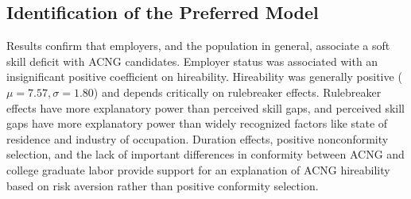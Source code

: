 \documentclass[review]{elsarticle}
\begin{document}



\subsection{Identification of the Preferred Model}

Results confirm that employers, and the population in general, associate a soft skill deficit with ACNG candidates.
Employer status was associated with an insignificant positive coefficient on hireability.
Hireability was generally positive ($\mu = 7.57, \sigma = 1.80$) and depends critically on rulebreaker effects.
Rulebreaker effects have more explanatory power than perceived skill gaps,
and perceived skill gaps have more explanatory power than widely recognized factors like state of residence and industry of occupation.
Duration effects, positive nonconformity selection,
and the lack of important differences in conformity between ACNG and college graduate labor
provide support for an explanation of ACNG hireability based on risk aversion rather than positive conformity selection.
\end{document}
